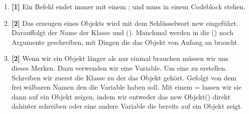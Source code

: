 \begin{enumerate}
          \begin{Infobox}{Namen}
              Freiwählbare Namen, müssen trotzdem ein paar Regeln Folgen
              \begin{itemize}
                  \item Sie dürfen nicht gleich wie ein Schlüsselwort(z.B. class oder new) heißen.
                  \item Sie dürfen nicht mit einer Ziffer beginnen.
                  \item Sie dürfen kein Leerzeichen beinhalten.
              \end{itemize}
          \end{Infobox}
    \item \textbf{[1]} Ein Befehl endet immer mit einem ; und muss in einem Codeblock stehen.
    \item \textbf{[2]} Das erzeugen eines Objekts wird mit dem Schlüsselwort new eingeführt. Darauffolgt der Name der Klasse und (). Manchmal werden in die () noch Argumente geschreiben, mit Dingen die das Objekt von Anfang an braucht.
    \item \textbf{[2]} Wenn wir ein Objekt länger als nur einmal brauchen müssen wir uns dieses Merken. Dazu verwenden wir eine Variable. Um eine zu erstellen. Schreiben wir zuerst die Klasse zu der das Objekt gehört. Gefolgt von dem frei wälbaren Namen den die Variable haben soll. Mit einem = lassen wir sie dann auf ein Objekt zeigen, indem wir entweder das new Objekt() direkt dahinter schreiben oder eine andere
          Variable die bereits auf ein Objekt zeigt.


\end{enumerate}
